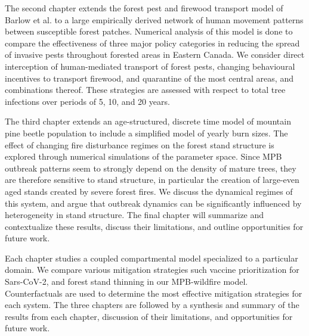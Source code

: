 The second chapter extends the forest pest and firewood transport model of Barlow et al. \cite{barlow2014modelling} to a large empirically derived network of human movement patterns between susceptible forest patches. Numerical analysis of this model is done to compare the effectiveness of three major policy categories in reducing the spread of invasive pests throughout forested areas in Eastern Canada. We consider direct interception of human-mediated transport of forest pests, changing behavioural incentives to transport firewood, and quarantine of the most central areas, and combinations thereof. These strategies are assessed with respect to total tree infections over periods of 5, 10, and 20 years.

The third chapter extends an age-structured, discrete time model of mountain pine beetle population \cite{duncan2015model} to include a simplified model of yearly burn sizes. The effect of changing fire disturbance regimes on the forest stand structure is explored through numerical simulations of the parameter space. Since MPB outbreak patterns seem to strongly depend on the density of mature trees, they are therefore sensitive to stand structure, in particular the creation of large-even aged stands created by severe forest fires. We discuss the dynamical regimes of this system, and argue that outbreak dynamics can be significantly influenced by heterogeneity in stand structure. The final chapter will summarize and contextualize these results, discuss their limitations, and outline opportunities for future work.

Each chapter studies a coupled compartmental model specialized to a particular domain. We compare various mitigation strategies such vaccine prioritization for Sars-CoV-2, and forest stand thinning in our MPB-wildfire model. Counterfactuals are used to determine the most effective mitigation strategies for each system. The three chapters are followed by a synthesis and summary of the results from each chapter, discussion of their limitations, and opportunities for future work. 